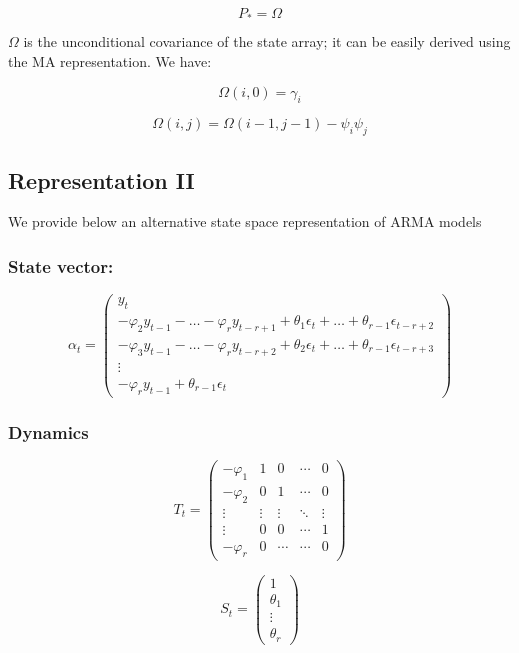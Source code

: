 \documentclass[
  letterpaper,
  DIV=11,
  numbers=noendperiod]{scrreprt}
\begin{document}
\[ P_{*} = \Omega \]

\(\Omega\) is the unconditional covariance of the state array; it can be
easily derived using the MA representation. We have:

\[ \Omega\left(i,0\right) = \gamma_i \]

\[ \Omega\left(i,j\right) = \Omega\left(i-1,j-1\right)-\psi_i \psi_j \]

\subsection{Representation II}\label{representation-ii}

We provide below an alternative state space representation of ARMA
models

\subsubsection{State vector:}\label{state-vector-1}

\[ \alpha_t= \begin{pmatrix} y_t \\ 
-\varphi_2 y_{t-1}-\dots-\varphi_r y_{t-r+1}+\theta_1 \epsilon_t+ \dots + \theta_{r-1} \epsilon_{t-r+2}\\ -\varphi_3 y_{t-1}-\dots-\varphi_r y_{t-r+2}+\theta_2 \epsilon_t+ \dots + \theta_{r-1} \epsilon_{t-r+3}\\ \vdots \\ 
-\varphi_r y_{t-1}+\theta_{r-1} \epsilon_{t}
\end{pmatrix}\]

\subsubsection{Dynamics}\label{dynamics-1}

\[ T_t = \begin{pmatrix}-\varphi_1 &1 & 0 & \cdots & 0  \\
-\varphi_2& 0 & 1 & \cdots & 0\\ 
\vdots & \vdots & \vdots & \ddots & \vdots\\ 
\vdots & 0 & 0 & \cdots & 1\\
-\varphi_r & 0  & \cdots & \cdots &0 \end{pmatrix}\]

\[ S_t = \begin{pmatrix}1 \\ \theta_1 \\ \vdots\\ \theta_r \end{pmatrix} \]
\end{document}
